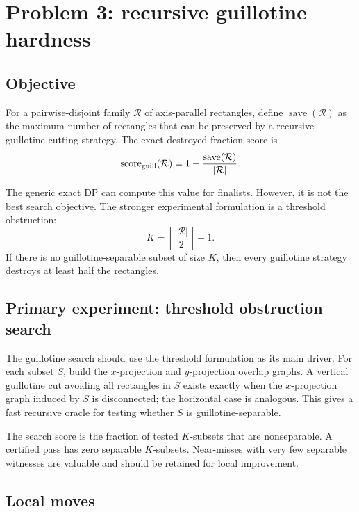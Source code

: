 \documentclass[11pt]{article}
\newcommand{\Rcal}{\mathcal{R}}
\newcommand{\score}{\operatorname{score}}
\newcommand{\save}{\operatorname{save}}
\begin{document}
\section{Problem 3: recursive guillotine hardness}

\subsection{Objective}

For a pairwise-disjoint family $\Rcal$ of axis-parallel rectangles, define
$\save(\Rcal)$ as the maximum number of rectangles that can be preserved by a
recursive guillotine cutting strategy.  The exact destroyed-fraction score is
\[
        \score_{\rm guill}(\Rcal)
        =
        1-\frac{\save(\Rcal)}{|\Rcal|}.
\]

The generic exact DP can compute this value for finalists.  However, it is not
the best search objective.  The stronger experimental formulation is a
threshold obstruction:
\[
        K=\left\lfloor\frac{|\Rcal|}{2}\right\rfloor+1.
\]
If there is no guillotine-separable subset of size $K$, then every guillotine
strategy destroys at least half the rectangles.

\subsection{Primary experiment: threshold obstruction search}

The guillotine search should use the threshold formulation as its main driver.
For each subset $S$, build the $x$-projection and $y$-projection overlap
graphs.  A vertical guillotine cut avoiding all rectangles in $S$ exists
exactly when the $x$-projection graph induced by $S$ is disconnected; the
horizontal case is analogous.  This gives a fast recursive oracle for testing
whether $S$ is guillotine-separable.

The search score is the fraction of tested $K$-subsets that are
nonseparable.  A certified pass has zero separable $K$-subsets.  Near-misses
with very few separable witnesses are valuable and should be retained for
local improvement.

\subsection{Local moves}
\end{document}

